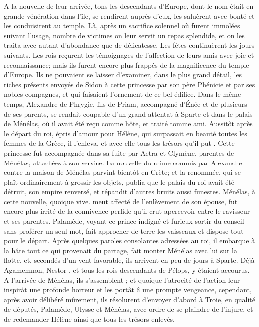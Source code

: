 \documentclass{article}
\begin{document}
A la nouvelle de leur arrivée, tons les descendants d'Europe, dont le nom était en grande vénération dans l'île, se rendirent auprès d'eux, les saluèrent avec bonté et les conduisirent au temple. Là, après un sacrifice solennel où furent immolées suivant l'usage, nombre de victimes on leur servit un repas splendide, et on les traita avec autant d'abondance que de délicatesse. Les fêtes continuèrent les jours suivants. Les rois reçurent les témoignages de l'affection de leurs amis avec joie et reconnaissance; mais ils furent encore plus frappés de la magnificence du temple d'Europe. Ils ne pouvaient se laisser d'examiner, dans le plus grand détail, les riches présents envoyés de Sidon à cette princesse par son père Phénicie et par ses nobles compagnes, et qui faisaient l'ornement de ce bel édifice.
 \pend
 \pstart
Dans le même temps, Alexandre de Phrygie, fils de Priam, accompagné d'Énée et de plusieurs de ses parents, se rendait coupable d'un grand attentat à Sparte et dans le palais de Ménélas, où il avait été reçu comme hôte, et traité tomme ami. Aussitôt après le départ du roi, épris d'amour pour Hélène, qui surpassait en beauté toutes les femmes de la Grèce, il l'enleva, et avec elle tous les trésors qu'il put . Cette princesse fut accompagnée dans sa fuite par Aetra et Clymène, parentes de Ménélas, attachées à son service. La nouvelle du crime commis par Alexandre contre la maison de Ménélas parvint bientôt en Crète; et la renommée, qui se plaît ordinairement à grossir les objets, publia que le palais du roi avait été détruit, son empire renversé, et répandit d'autres bruits aussi funestes.
 \pend
 \pstart
Ménélas, à cette nouvelle, quoique vive. meut affecté de l'enlèvement de son épouse, fut encore plus irrité de la connivence perfide qu'il crut apercevoir entre le ravisseur et ses parentes. Palamède, voyant ce prince indigné et furieux sortir du conseil sans proférer un seul mot, fait approcher de terre les vaisseaux et dispose tout pour le départ. Après quelques paroles consolantes adressées au roi, il embarque à la hâte tout ce qui provenait du partage, fait monter Ménélas avec lui sur la flotte, et, secondés d'un vent favorable, ils arrivent en peu de jours à Sparte. Déjà Agamemnon, Nestor , et tous les rois descendants de Pélops, y étaient accourus. A l'arrivée de Ménélas, ils s'assemblent ; et quoique l'atrocité de l'action leur inspiràt une profonde horreur et les portât â une prompte vengeance, cependant, après avoir délibéré mûrement, ils résolurent d'envoyer d'abord à Troie, en qualité de députés, Palamède, Ulysse et Ménélas, avec ordre de se plaindre de l'injure, et de redemander Hélène ainsi que tous les trésors enlevés.
\pend
\endnumbering
\end{document}
